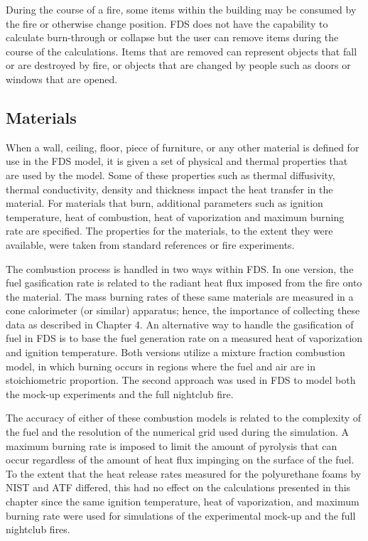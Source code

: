 \documentclass[11pt]{book}
\begin{document}
During the course of a fire, some items within the building may be consumed by the fire or otherwise change position. FDS does not have the capability to calculate burn-through or collapse but the user can remove items during the course of the calculations. Items that are removed can represent objects that fall or are destroyed by fire, or objects that are changed by people such as doors or windows that are opened.


\subsection{Materials}
When a wall, ceiling, floor, piece of furniture, or any other material is defined for use in the FDS model, it is given a set of physical and thermal properties that are used by the model. Some of these properties such as thermal diffusivity, thermal conductivity, density and thickness impact the heat transfer in the material. For materials that burn, additional parameters such as ignition temperature, heat of combustion, heat of vaporization and maximum burning rate are specified. The properties for the materials, to the extent they were available, were taken from standard references or fire experiments.

The combustion process is handled in two ways within FDS. In one version, the fuel gasification rate is related to the radiant heat flux imposed from the fire onto the material. The mass burning rates of these same materials are measured in a cone calorimeter (or similar) apparatus; hence, the importance of collecting these data as described in Chapter 4. An alternative way to handle the gasification of fuel in FDS is to base the fuel generation rate on a measured heat of vaporization and ignition temperature. Both versions utilize a mixture fraction combustion model, in which burning occurs in regions where the fuel and air are in stoichiometric proportion. The second approach was used in FDS to model both the mock-up experiments and the full nightclub fire.

The accuracy of either of these combustion models is related to the complexity of the fuel and the resolution of the numerical grid used during the simulation. A maximum burning rate is imposed to limit the amount of pyrolysis that can occur regardless of the amount of heat flux impinging on the surface of the fuel. To the extent that the heat release rates measured for the polyurethane foams by NIST and ATF differed, this had no effect on the calculations presented in this chapter since the same ignition temperature, heat of vaporization, and maximum burning rate were used for simulations of the experimental mock-up and the full nightclub fires.
\end{document}
